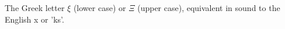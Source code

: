 The Greek letter $ \xi $ (lower case) or $ \Xi $ (upper case), equivalent in sound
to the English x or 'ks'.